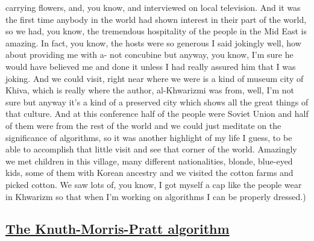 \documentclass[]{article}
\begin{document}
carrying flowers, and, you know, and interviewed on local television.
And it was the first time anybody in the world had shown interest in
their part of the world, so we had, you know, the tremendous hospitality
of the people in the Mid East is amazing. In fact, you know, the hosts
were so generous I said jokingly well, how about providing me with a-
not concubine but anyway, you know, I'm sure he would have believed me
and done it unless I had really assured him that I was joking. And we
could visit, right near where we were is a kind of museum city of Khiva,
which is really where the author, al-Khwarizmi was from, well, I'm not
sure but anyway it's a kind of a preserved city which shows all the
great things of that culture. And at this conference half of the people
were Soviet Union and half of them were from the rest of the world and
we could just meditate on the significance of algorithms, so it was
another highlight of my life I guess, to be able to accomplish that
little visit and see that corner of the world. Amazingly we met children
in this village, many different nationalities, blonde, blue-eyed kids,
some of them with Korean ancestry and we visited the cotton farms and
picked cotton. We saw lots of, you know, I got myself a cap like the
people wear in Khwarizm so that when I'm working on algorithms I can be
properly dressed.)

\subsection{\texorpdfstring{\href{http://webofstories.com/play/17151}{The
Knuth-Morris-Pratt
algorithm}}{The Knuth-Morris-Pratt algorithm}}\label{the-knuth-morris-pratt-algorithm}
\end{document}
